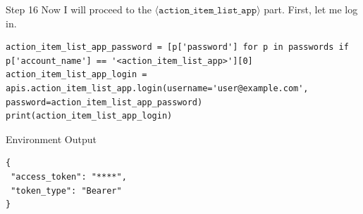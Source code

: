 \begin{agentbox}{Step 16}
Now I will proceed to the $\langle\mathtt{action\_item\_list\_app}\rangle$ part. First, let me log in.
\begin{Verbatim}[fontsize=\scriptsize, breaklines, breakanywhere]
action_item_list_app_password = [p['password'] for p in passwords if p['account_name'] == '<action_item_list_app>'][0]
action_item_list_app_login = apis.action_item_list_app.login(username='user@example.com', password=action_item_list_app_password)
print(action_item_list_app_login)
\end{Verbatim}
\end{agentbox}
\begin{envbox}{Environment Output}
\begin{Verbatim}[fontsize=\scriptsize, breaklines, breakanywhere]
{
 "access_token": "****",
 "token_type": "Bearer"
}

\end{Verbatim}
\end{envbox}

